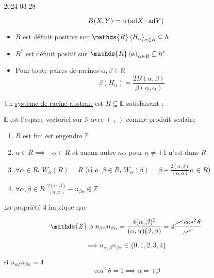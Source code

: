 


2024-03-28


\begin{tcolorbox}[title=Rappels]

\[ B(X,Y) = \tr({\rm{}ad} X \cdot  {\rm{}ad}Y) \]

\begin{itemize}
	\item \(B\) est définit positive sur \(\mathds{R} \expval{H_{\alpha} }_{\alpha \in R} \subseteq h\)
	\item \(B^{*}\) est définit positif sur \(\mathds{R} \expval{\alpha}_{\alpha\in R} \subseteq h^{*}\)
\item Pour toute paires de racines \(\alpha, \beta \in \mathds{R}\)
	\[ \beta(H_{\alpha}) = \frac{2 B(\alpha, \beta)}{\beta(\alpha,\alpha) }  \]
\end{itemize}
	 
\end{tcolorbox}

Un \underline{système de racine abstrait} est \(R \subseteq \mathds{E} \) satisfaisant :

\begin{tcolorbox}[]
	\(\mathds{E}\) est l'espace vectoriel sur \(\mathds{R}\) avec \((\ , \ )\) comme produit scalaire 
\end{tcolorbox}

\begin{enumerate}
	\item \(R\) est fini est engendre \(\mathds{E}\)
	\item \(\alpha \in R \implies -\alpha \in R\) et aucun autre \(n\alpha \) pour \(n\neq \pm 1\) n'est dans \(R\)
	\item \(\forall \alpha \in R\), \(W_{\alpha} (R) = R\)
		(si \(\alpha,\beta \in R\), \(W_{\alpha} (\beta) = \beta - \frac{2 (\alpha, \beta) }{(\alpha ,\alpha)} \alpha \in R \))
	\item \(\forall \alpha, \beta \in R\) \(\frac{2 (\alpha,\beta)}{(\alpha,\alpha) } - n_{\beta\alpha} \in \mathds{Z} \)
\end{enumerate}

La propriété 4 implique que


\[ \mathds{Z} \ni n_{\beta\alpha} n_{\beta\alpha} =\frac{4 (\alpha,\beta )^2}{(\alpha, \alpha) (\beta, \beta)} = 4 \frac{\cancel{\dotsb}\cos^{2}\theta}{\cancel{\dotsb}}   \]

\[ \implies n_{\alpha,\beta} n_{\beta\alpha} \in \{ 0,1,2,3,4 \}  \]

si \(n_{\alpha\beta} n_{\beta\alpha} = 4\)
\[ \cos^2\theta =1 \implies \alpha =\pm \beta \]

